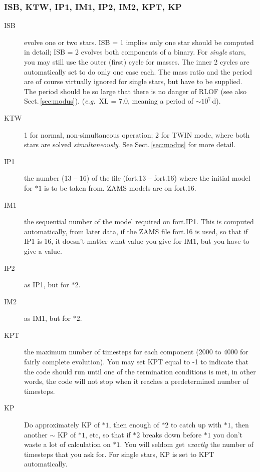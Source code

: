 \subsubsection*{ISB, KTW, IP1, IM1, IP2, IM2, KPT, KP}
\begin{description}
\item[ISB]\hypertarget{isb}{} evolve one or two stars. 
  ISB = 1 implies only one star should be computed in detail; 
  ISB = 2 evolves both components of a binary. For \emph{single} stars, you may still use the outer 
  (first) cycle for masses. The inner 2 cycles are automatically set to do only one 
  case each. The mass ratio and the period are of course virtually ignored for single stars, 
  but have to be supplied. The period should be so large that there is no danger of RLOF
  (see also Sect.\,\ref{sec:modus}).
  (\emph{e.g.}\ XL = 7.0, meaning a period of $\sim 10^7\,$d).
\item[KTW]\hypertarget{ktw}{}  1 for normal, non-simultaneous operation; 2 for TWIN mode, where both stars are solved 
  \emph{simultaneously}.  See Sect.\,\ref{sec:modus} for more detail.
\item[IP1]\hypertarget{ip1}{} the number (13 -- 16) of the file (fort.13 -- fort.16) where the
  initial model for $*1$ is to be taken from. ZAMS models are on fort.16.
\item[IM1]\hypertarget{im1}{} the sequential number of the model required on fort.IP1. This is
  computed automatically, from later data, if the ZAMS file fort.16 is used,
  so that if IP1 is 16, it doesn't matter what value you give for IM1, but
  you have to give a value.
\item[IP2]\hypertarget{ip2}{}  as IP1, but for $*2$.
\item[IM2]\hypertarget{im2}{} as IM1, but for $*2$.
\item[KPT]\hypertarget{kpt}{} the maximum number of timesteps for each component (2000 to 4000 
  for fairly complete evolution). 
  You may set KPT equal to -1 to indicate that the code should run until
  one of the termination conditions is met, in other words, the code will
  not stop when it reaches a predetermined number of timesteps.
\item[KP]\hypertarget{kp}{}  Do approximately KP of $*1$, then enough of $*2$
  to catch up with $*1$, then another $\sim$ KP of $*1$, etc, so that if $*2$ 
  breaks down before $*1$ you don't waste a lot of calculation on $*1$. 
  You will seldom get \emph{exactly} the number of timesteps that you ask for.
  For single stars, KP is set to KPT automatically.
\end{description}



